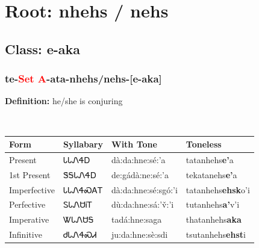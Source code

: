 \needspace{4in}
\section*{Root: nhehs / nehs}
\nopagebreak
{}
\needspace{3in}
\subsection*{Class: e-aka}
\nopagebreak
\needspace{2in}
\subsubsection*{te{-}\textcolor{Red}{Set A}{-}ata{-}\textbf{nhehs/nehs}{-}[e-aka]}
\nopagebreak
\textbf{Definition: } he/she is conjuring
\\[0.5em]
\begin{tabularx}{\textwidth}{l X X X}%
\toprule%
\textbf{Form}&\textbf{Syllabary}&\textbf{With Tone}&\textbf{Toneless}\\%
\midrule%
Present&ᏓᏓᏁᏎᎠ&dà:da:hne:sé:’a&tatanhehs\textbf{e'}a\\%
1st Present&ᏕᎦᏓᏁᏎᎠ&de:gádà:ne:sé:’a&tekatanehs\textbf{e'}a\\%
Imperfective&ᏓᏓᏁᏎᏍᎪᎢ&dà:da:hne:sé:sgó:’i&tatanhehs\textbf{ehsk}o'i\\%
Perfective&ᏚᏓᏁᏌᎥᎢ&dù:da:hne:sá:’v̌:’i&tutanhehs\textbf{a'}v'i\\%
Imperative&ᏔᏓᏁᏌᎦ&tadá:hne:saga&thatanhehs\textbf{aka}\\%
Infinitive&ᏧᏓᏁᏎᏍᏗ&ju:da:hne:sè:sdi&tsutanhehs\textbf{ehst}i\\%
\bottomrule%
\end{tabularx}
\\[1em]